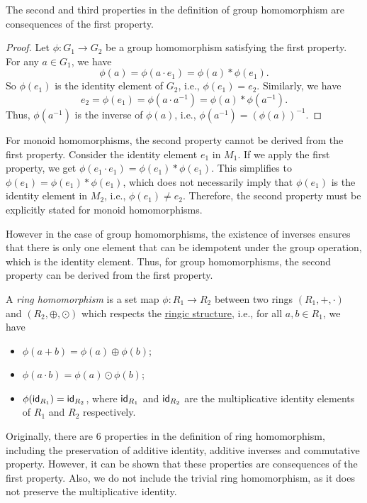 \begin{proposition}
  The second and third properties in the definition of group homomorphism are consequences of the first property.
\end{proposition}
\begin{proof}
  Let $\phi \colon G_1 \to G_2$ be a group homomorphism satisfying the first property. For any $a \in G_1$, we have
  \[ \phi(a) = \phi(a \cdot e_1) = \phi(a) * \phi(e_1). \]
  So $\phi(e_1)$ is the identity element of $G_2$, i.e., $\phi(e_1) = e_2$. Similarly, we have
  \[ e_2 = \phi(e_1) = \phi(a \cdot a^{-1}) = \phi(a) * \phi(a^{-1}). \]
  Thus, $\phi(a^{-1})$ is the inverse of $\phi(a)$, i.e., $\phi(a^{-1}) = {(\phi(a))}^{-1}$.
\end{proof}

For monoid homomorphisms, the second property cannot be derived from the first property. Consider the identity element $e_1$ in $M_1$. If we apply the first property, we get $\phi(e_1 \cdot e_1) = \phi(e_1) * \phi(e_1)$. This simplifies to $\phi(e_1) = \phi(e_1) * \phi(e_1)$, which does not necessarily imply that $\phi(e_1)$ is the identity element in $M_2$, i.e., $\phi(e_1) \neq e_2$. Therefore, the second property must be explicitly stated for monoid homomorphisms.

However in the case of group homomorphisms, the existence of inverses ensures that there is only one element that can be idempotent under the group operation, which is the identity element. Thus, for group homomorphisms, the second property can be derived from the first property.

\begin{definition}\label{def:ring_homomorphism}
  A \emph{ring homomorphism} is a set map $\phi \colon R_1 \to R_2$ between two rings $(R_1, +, \cdot)$ and $(R_2, \oplus, \odot)$ which respects the \hyperref[def:ringic_structure]{ringic structure}, i.e., for all $a, b \in R_1$, we have
  \begin{itemize}
    \item $\phi(a + b) = \phi(a) \oplus \phi(b)$;
    \item $\phi(a \cdot b) = \phi(a) \odot \phi(b)$;
    \item $\phi(\operatorname{\text{\normalfont\sffamily id}}_{R_1}) = \operatorname{\text{\normalfont\sffamily id}}_{R_2}$, where $\operatorname{\text{\normalfont\sffamily id}}_{R_1}$ and $\operatorname{\text{\normalfont\sffamily id}}_{R_2}$ are the multiplicative identity elements of $R_1$ and $R_2$ respectively.
  \end{itemize}
\end{definition}

\begin{remark}
  Originally, there are 6 properties in the definition of ring homomorphism, including the preservation of additive identity, additive inverses and commutative property. However, it can be shown that these properties are consequences of the first property. Also, we do not include the trivial ring homomorphism, as it does not preserve the multiplicative identity.
\end{remark}

